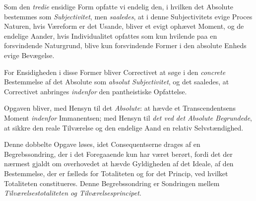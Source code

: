 Som den \emph{tredie} ensidige Form opfatte vi endelig den, i hvilken det
Absolute bestemmes som \emph{Subjectivitet}, men \emph{saaledes}, at i denne
Subjectivitets evige Proces Naturen, hvis Væreform er det Usande, bliver et
evigt ophævet Moment, og de endelige Aander, hvis Individualitet opfattes som
kun hvilende paa en forsvindende Naturgrund, blive kun forsvindende Former i
den absolute Enheds evige Bevægelse.

For Ensidigheden i disse Former bliver Correctivet at søge i den
\emph{concrete} Bestemmelse af det Absolute som \emph{absolut Subjectivitet},
og det saaledes, at Correctivet anbringes \emph{indenfor} den pantheistiske
Opfattelse.

Opgaven bliver, med Hensyn til det \emph{Absolute}: at hævde et
Transcendentsens Moment \emph{indenfor} Immanentsen; med Hensyn til \emph{det
ved det Absolute Begrundede}, at sikkre den reale Tilværelse og den endelige
Aand en relativ Selvstændighed.

Denne dobbelte Opgave løses, idet Consequentserne drages af en
Begrebssondring, der i det Foregaaende kun har været berørt, fordi det der
nærmest gjaldt om overhovedet at hævde Gyldigheden af det Ideale, af den
Bestemmelse, der er fælleds for Totaliteten og for det Princip, ved hvilket
Totaliteten constitueres. Denne Begrebssondring er Sondringen mellem
\emph{Tilværelsestotaliteten og Tilværelsesprincipet}.

